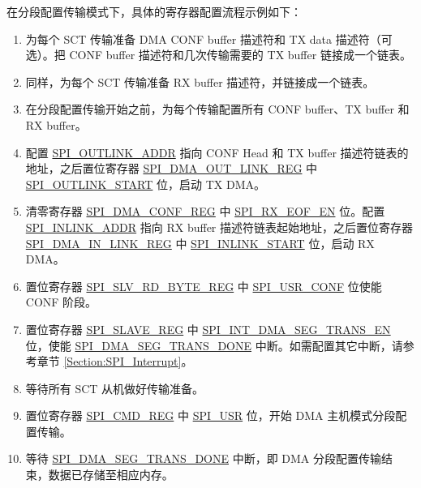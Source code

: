 \documentclass[main\_\_CN.tex]{subfiles}
\begin{document}
在分段配置传输模式下，具体的寄存器配置流程示例如下：
 \begin{enumerate}
   \item 为每个 SCT 传输准备 DMA CONF buffer 描述符和 TX data 描述符（可选）。把 CONF buffer 描述符和几次传输需要的 TX buffer 链接成一个链表。

   \item 同样，为每个 SCT 传输准备 RX buffer 描述符，并链接成一个链表。

   \item 在分段配置传输开始之前，为每个传输配置所有 CONF buffer、TX buffer 和 RX buffer。

   \item 配置 \hyperref[fielddesc:SPIOUTLINKADDR]{SPI\_OUTLINK\_ADDR} 指向 CONF Head 和 TX buffer 描述符链表的地址，之后置位寄存器 \hyperref[regdesc:SPIDMAOUTLINKREG]{SPI\_DMA\_OUT\_LINK\_REG} 中 \hyperref[fielddesc:SPIOUTLINKSTART]{SPI\_OUTLINK\_START} 位，启动 TX DMA。

   \item 清零寄存器 \hyperref[regdesc:SPIDMACONFREG]{SPI\_DMA\_CONF\_REG} 中 \hyperref[fielddesc:SPIRXEOFEN]{SPI\_RX\_EOF\_EN} 位。配置 \hyperref[fielddesc:SPIINLINKSTART]{SPI\_INLINK\_ADDR} 指向 RX buffer 描述符链表起始地址，之后置位寄存器 \hyperref[regdesc:SPIDMAINLINKREG]{SPI\_DMA\_IN\_LINK\_REG} 中 \hyperref[fielddesc:SPIINLINKSTART]{SPI\_INLINK\_START} 位，启动 RX DMA。

   \item 置位寄存器 \hyperref[regdesc:SPISLVRDBYTEREG]{SPI\_SLV\_RD\_BYTE\_REG} 中 \hyperref[fielddesc:SPIUSRCONF]{SPI\_USR\_CONF} 位使能 CONF 阶段。

   \item 置位寄存器 \hyperref[regdesc:SPISLAVEREG]{SPI\_SLAVE\_REG} 中 \hyperref[fielddesc:SPIINTDMASEGTRANSEN]{SPI\_INT\_DMA\_SEG\_TRANS\_EN} 位，使能 \hyperref[fielddesc:SPIDMASEGTRANSDONE]{SPI\_DMA\_SEG\_TRANS\_DONE} 中断。如需配置其它中断，请参考章节 \ref{Section:SPI_Interrupt}。

   \item 等待所有 SCT 从机做好传输准备。

   \item 置位寄存器 \hyperref[regdesc:SPICMDREG]{SPI\_CMD\_REG} 中 \hyperref[fielddesc:SPIUSR]{SPI\_USR} 位，开始 DMA 主机模式分段配置传输。

   \item 等待 \hyperref[fielddesc:SPIDMASEGTRANSDONE]{SPI\_DMA\_SEG\_TRANS\_DONE} 中断，即 DMA 分段配置传输结束，数据已存储至相应内存。
 \end{enumerate}
\end{document}
